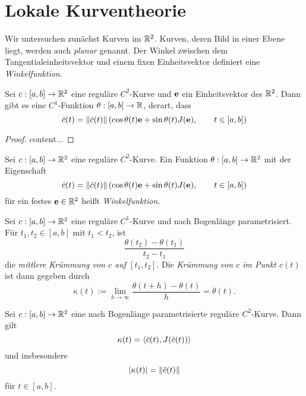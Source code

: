 \documentclass[
pdftex,
oneside,
headsepline,
11pt, 
]{scrreprt}
\begin{document}
\chapter{Lokale Kurventheorie}
Wir untersuchen zunächst Kurven im $\mathbb{R}^2$. Kurven, deren Bild in einer Ebene liegt, werden auch \textit{planar} genannt. Der Winkel zwischen dem Tangentialeinheitsvektor und einem fixen Einheitsvektor definiert eine \textit{Winkelfunktion}.
\begin{lem}
	Sei $c:[a,b]\to \mathbb{R}^2$ eine reguläre $C^2$-Kurve und $\textnormal{\textbf{e}}$ ein Einheitsvektor des $\mathbb{R}^2$. Dann gibt es eine $C^1$-Funktion $\theta:[a,b]\to \mathbb{R}$, derart, dass \[  \dot{c}(t)=\left\lVert\dot{c}(t)\right\rVert\left(  \cos \theta(t)\textnormal{\textbf{e}}+\sin\theta(t)J(\textnormal{\textbf{e}}), \qquad t\in [a,b]  \right) \]	
\end{lem}
\begin{proof}
	content...
\end{proof}
\begin{de}[Winkelfunktion]
	Sei $c:[a,b]\to \mathbb{R}^2$ eine reguläre $C^2$-Kurve. Ein Funktion $\theta:[a,b]\to\mathbb{R}^2$ mit der Eigenschaft \[  \dot{c}(t)=\left\lVert\dot{c}(t)\right\rVert\left(  \cos \theta(t)\textnormal{\textbf{e}}+\sin\theta(t)J(\textnormal{\textbf{e}}), \qquad t\in [a,b]  \right) \]
	für ein festes $\textnormal{\textbf{e}}\in\mathbb{R}^2$ heißt \textit{Winkelfunktion}.
\end{de}
\begin{de}
	Sei $c:[a,b]\to \mathbb{R}^2$ eine reguläre $C^1$-Kurve und nach Bogenlänge parametrisiert. Für $t_1,t_2\in[a,b]$ mit $t_1<t_2$, ist \[ \frac{\theta(t_2)-\theta(t_1)}{t_2-t_1} \] die \textit{mittlere Krümmung von $c$ auf $[t_1,t_2]$}. Die \textit{Krümmung von $c$ im Punkt $c(t)$} ist dann gegeben durch \[ \kappa(t):=\lim_{h\to \infty} \frac{\theta(t+h)-\theta(t)}{h}=\dot{\theta}(t). \]  
\end{de}
\begin{lem}
	Sei $c:[a,b]\to \mathbb{R}^2$ eine nach Bogenlänge parametrisierte reguläre $C^2$-Kurve. Dann gilt
	\[ \kappa(t)=\left\langle \ddot{c}(t),J(\dot{c}(t)) \right\rangle \] und insbesondere 
	\[|\kappa(t)|=\left\lVert\ddot{c}(t)\right\rVert\] für $t\in[a,b]$.
\end{lem}
\end{document}
